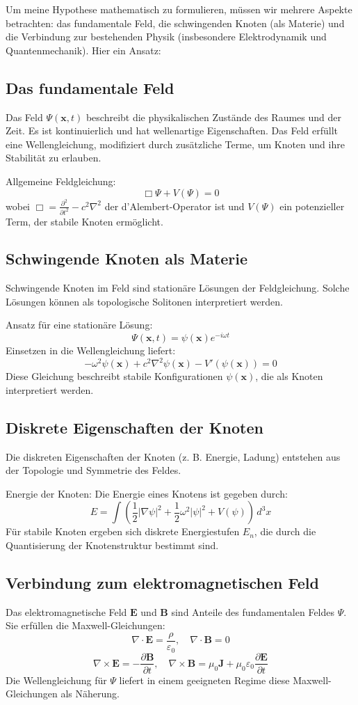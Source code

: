 \documentclass[12pt,a4paper]{article}
\begin{document}
	Um meine Hypothese mathematisch zu formulieren, müssen wir mehrere Aspekte betrachten: das fundamentale Feld, die schwingenden Knoten (als Materie) und die Verbindung zur bestehenden Physik (insbesondere Elektrodynamik und Quantenmechanik). Hier ein Ansatz:
	
	\subsection{Das fundamentale Feld}
	Das Feld $\Psi(\mathbf{x}, t)$ beschreibt die physikalischen Zustände des Raumes und der Zeit. Es ist kontinuierlich und hat wellenartige Eigenschaften. Das Feld erfüllt eine Wellengleichung, modifiziert durch zusätzliche Terme, um Knoten und ihre Stabilität zu erlauben.
	
	Allgemeine Feldgleichung:
	\[
	\Box \Psi + V(\Psi) = 0
	\]
	wobei $\Box = \frac{\partial^2}{\partial t^2} - c^2 \nabla^2$ der d'Alembert-Operator ist und $V(\Psi)$ ein potenzieller Term, der stabile Knoten ermöglicht.
	
	\subsection{Schwingende Knoten als Materie}
	Schwingende Knoten im Feld sind stationäre Lösungen der Feldgleichung. Solche Lösungen können als topologische Solitonen interpretiert werden.
	
	Ansatz für eine stationäre Lösung:
	\[
	\Psi(\mathbf{x}, t) = \psi(\mathbf{x}) e^{-i \omega t}
	\]
	Einsetzen in die Wellengleichung liefert:
	\[
	-\omega^2 \psi(\mathbf{x}) + c^2 \nabla^2 \psi(\mathbf{x}) - V'(\psi(\mathbf{x})) = 0
	\]
	Diese Gleichung beschreibt stabile Konfigurationen $\psi(\mathbf{x})$, die als Knoten interpretiert werden.
	
	\subsection{Diskrete Eigenschaften der Knoten}
	Die diskreten Eigenschaften der Knoten (z. B. Energie, Ladung) entstehen aus der Topologie und Symmetrie des Feldes.
	
	Energie der Knoten:
	Die Energie eines Knotens ist gegeben durch:
	\[
	E = \int \left( \frac{1}{2} \left| \nabla \psi \right|^2 + \frac{1}{2} \omega^2 \left| \psi \right|^2 + V(\psi) \right) \, d^3x
	\]
	Für stabile Knoten ergeben sich diskrete Energiestufen $E_n$, die durch die Quantisierung der Knotenstruktur bestimmt sind.
	
	\subsection{Verbindung zum elektromagnetischen Feld}
	Das elektromagnetische Feld $\mathbf{E}$ und $\mathbf{B}$ sind Anteile des fundamentalen Feldes $\Psi$. Sie erfüllen die Maxwell-Gleichungen:
	\[
	\nabla \cdot \mathbf{E} = \frac{\rho}{\varepsilon_0}, \quad \nabla \cdot \mathbf{B} = 0
	\]
	\[
	\nabla \times \mathbf{E} = -\frac{\partial \mathbf{B}}{\partial t}, \quad \nabla \times \mathbf{B} = \mu_0 \mathbf{J} + \mu_0 \varepsilon_0 \frac{\partial \mathbf{E}}{\partial t}
	\]
	Die Wellengleichung für $\Psi$ liefert in einem geeigneten Regime diese Maxwell-Gleichungen als Näherung.
	
\end{document}
